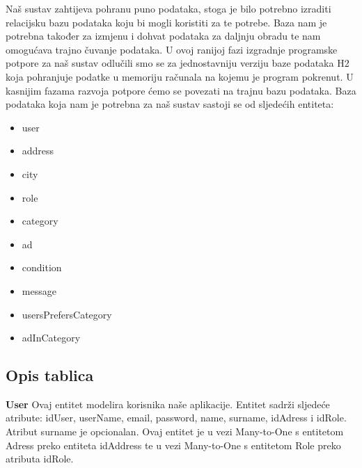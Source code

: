 	  Naš sustav zahtijeva pohranu puno podataka, stoga je bilo potrebno izraditi relacijsku bazu podataka koju bi mogli koristiti za te potrebe. Baza nam je potrebna također za izmjenu i dohvat podataka za daljnju obradu te nam omogućava trajno čuvanje podataka. U ovoj ranijoj fazi izgradnje programske potpore za naš sustav odlučili smo se za jednostavniju verziju baze podataka H2 koja pohranjuje podatke u memoriju računala na kojemu je program pokrenut. U kasnijim fazama razvoja potpore ćemo se povezati na trajnu bazu podataka. Baza podataka koja nam je potrebna za naš sustav sastoji se od sljedećih entiteta:
		\begin{itemize}
			\item user
			\item address
			\item city
			\item role
			\item category
			\item ad
			\item condition
			\item message
			\item usersPrefersCategory
			\item adInCategory
			
		
		\end{itemize}
		
			\subsection{Opis tablica}
			
				\textbf{User	}
				Ovaj entitet modelira korisnika naše aplikacije. Entitet sadrži sljedeće atribute: idUser, userName, email, password, name, surname, idAdress i idRole. Atribut surname je opcionalan. Ovaj entitet je u vezi Many-to-One s entitetom Adress preko entiteta idAddress te u vezi Many-to-One s entitetom Role preko atributa idRole.
				

